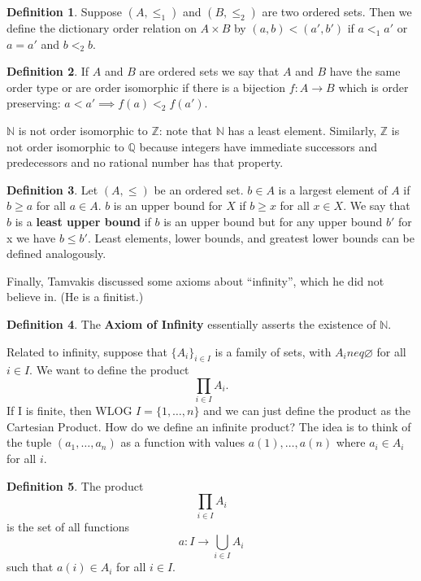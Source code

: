 \documentclass[12pt]{article}
\theoremstyle{plain}
\theoremstyle{definition}
\newtheorem{definition}{Definition}
\begin{document}
\begin{definition}
Suppose $(A, \leq_1)$ and $(B, \leq_2)$ are two ordered sets. Then we define the dictionary order relation on $A \times B$ by $(a, b) < (a', b')$ if $a <_1 a'$ or $a = a'$ and $b<_2 b$.
\end{definition}

\begin{definition}
If $A$ and $B$ are ordered sets we say that $A$ and $B$ have the same order type or are order isomorphic if there is a bijection $f: A \to B$ which is order preserving: $a < a' \implies f(a) <_2 f(a')$.
\end{definition}

$\mathbb{N}$ is not order isomorphic to $\mathbb{Z}$: note that $\mathbb{N}$ has a least element. Similarly, $\mathbb{Z}$ is not order isomorphic to $\mathbb{Q}$ because integers have immediate successors and predecessors and no rational number has that property.

\begin{definition}
	Let $(A, \leq)$ be an ordered set. $b \in A$ is a largest element of $A$ if $b \geq a$ for all $a \in A$. $b$ is an upper bound for $X$ if $b \geq x$ for all $x \in X$. We say that $b$ is a \textbf{least upper bound} if $b$ is an upper bound but for any upper bound $b'$ for x we have $b \leq b'$.
	Least elements, lower bounds, and greatest lower bounds can be defined analogously.
\end{definition}

Finally, Tamvakis discussed some axioms about ``infinity'', which he did not believe in. (He is a finitist.) 
\begin{definition}
	The \textbf{Axiom of Infinity} essentially asserts the existence of $\mathbb{N}$.
\end{definition}

Related to infinity, suppose that $\{A_i\}_{i \in I}$ is a family of sets, with $A_i neq \varnothing$ for all $i \in I$. We want to define the product 
\[\prod_{i \in I}A_i.\]
If I is finite, then WLOG $I = \{1, \dotsc, n\}$ and we can just define the product as the Cartesian Product. How do we define an infinite product? The idea is to think of the tuple $(a_1, \dots, a_n)$ as a function with values $a(1), \dotsc, a(n)$ where $a_i \in A_i$ for all $i$. 

\begin{definition}
	The product 
	\[\prod_{i \in I}A_i\] is the set of all functions \[a: I \to \bigcup_{i \in I}A_i\] such that $a(i) \in A_i$ for all $i \in I$. 
\end{definition}
\end{document}
